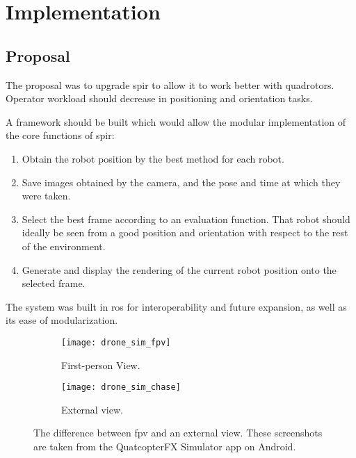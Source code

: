 \chapter{Implementation}
\label{ch:implementation}

\section{Proposal}
\label{sec:proposal}
  The proposal was to upgrade \gls{spir} to allow it to work better with quadrotors.
  Operator workload should decrease in positioning and orientation tasks.

  A framework should be built which would allow the modular implementation of the core functions of \gls{spir}:

  \begin{enumerate}
    \item Obtain the robot position by the best method for each robot.
    \item Save images obtained by the camera, and the pose and time at which they were taken.
    \item Select the best frame according to an evaluation function.
          That robot should ideally be seen from a good position and orientation with respect to the rest of the environment.
    \item Generate and display the rendering of the current robot position onto the selected frame.
  \end{enumerate}

  The system was built in \gls{ros} for interoperability and future expansion, as well as its ease of modularization.

  \begin{figure}[h]
    \centering
    \begin{subfigure}[b]{0.45\textwidth}
      \texttt{[image: drone\_sim\_fpv]}
      \caption{First-person View.}
    \end{subfigure}
    \hfill
    \begin{subfigure}[b]{0.45\textwidth}
      \texttt{[image: drone\_sim\_chase]}
      \caption{External view.}
    \end{subfigure}
    \caption[Difference between FPV and external views]{The difference between \gls{fpv} and an external view. These screenshots are taken from the QuatcopterFX Simulator app on Android.}
    \label{fig:fpv_vs_chase}
  \end{figure}

